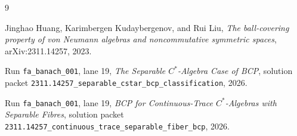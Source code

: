 \documentclass[11pt]{article}
\begin{document}
\begin{thebibliography}{9}

Jinghao Huang, Karimbergen Kudaybergenov, and Rui Liu,
\emph{The ball-covering property of von Neumann algebras and noncommutative
symmetric spaces},
arXiv:2311.14257, 2023.

Run \texttt{fa\_banach\_001}, lane 19,
\emph{The Separable \(C^*\)-Algebra Case of BCP},
solution packet
\texttt{2311.14257\_separable\_cstar\_bcp\_classification}, 2026.

Run \texttt{fa\_banach\_001}, lane 19,
\emph{BCP for Continuous-Trace \(C^*\)-Algebras with Separable Fibres},
solution packet
\texttt{2311.14257\_continuous\_trace\_separable\_fiber\_bcp}, 2026.

\end{thebibliography}
\end{document}
